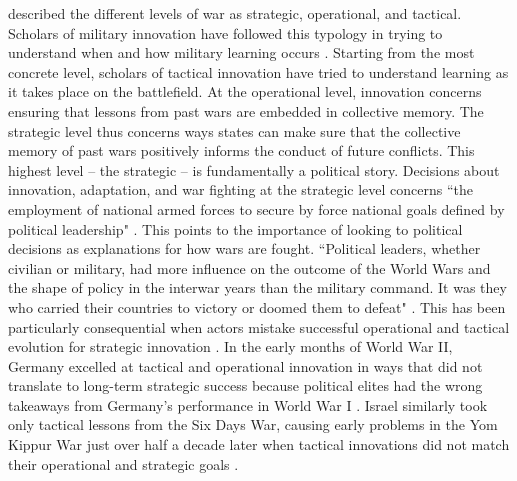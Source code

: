 \documentclass[12pt,letterpaper]{article}
\begin{document}
	\citet[127-132]{clausewitz_war_1976} described the different levels of war as strategic, operational, and tactical. Scholars of military innovation have followed this typology in trying to understand when and how military learning occurs \citep{millett_effectivenessmilitaryorganizations_1986, millett_lessonswar_1988}. Starting from the most concrete level, scholars of tactical innovation have tried to understand learning as it takes place on the battlefield. At the operational level, innovation concerns ensuring that lessons from past wars are embedded in collective memory. The strategic level thus concerns ways states can make sure that the collective memory of past wars positively informs the conduct of future conflicts. This highest level -- the strategic -- is fundamentally a political story. Decisions about innovation, adaptation, and war fighting at the strategic level concerns ``the employment of national armed forces to secure by force national goals defined by political leadership" \citep[42]{millett_effectivenessmilitaryorganizations_1986}. This points to the importance of looking to political decisions as explanations for how wars are fought. ``Political leaders, whether civilian or military, had more influence on the outcome of the World Wars and the shape of policy in the interwar years than the military command. It was they who carried their countries to victory or doomed them to defeat" \citep[85]{millett_lessonswar_1988}. This has been particularly consequential when actors mistake successful operational and tactical evolution for strategic innovation \citep{zabecki_german1918offensives_2006}. In the early months of World War II, Germany excelled at tactical and operational innovation in ways that did not translate to long-term strategic success because political elites had the wrong takeaways from Germany's performance in World War I \citep{herwig_politicsfrustrationunited_1976, murray_germanmilitaryeffectiveness_1992}. Israel similarly took only tactical lessons from the Six Days War, causing early problems in the Yom Kippur War just over half a decade later when tactical innovations did not match their operational and strategic goals \citep[7.8-7.9]{murray_militaryadaptationwar_2009}.
\end{document}
